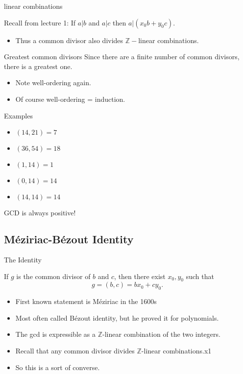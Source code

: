 \documentclass{beamer}
\begin{document}
\begin{frame}{linear combinations}

  Recall from lecture 1: If $a | b$ and $a | c$ then $a|(x_0b +
  y_0c)$.
  \begin{itemize}
  \item Thus a common divisor also divides $\mathbb{Z}-$linear
    combinations.
  \end{itemize}
\end{frame}
  
\begin{frame}{Greatest common divisors}
  Since there are a finite number of common divisors, there is a
  greatest one.
  \begin{itemize}
  \item Note well-ordering again.
  \item Of course well-ordering = induction.
  \end{itemize}
\end{frame}

\begin{frame}{Examples}
  \begin{itemize}
  \item $(14, 21) = 7$
  \item $(36, 54) = 18$
  \item $(1, 14) = 1$
  \item $(0, 14) = 14$
  \item $(14, 14) = 14$
  \end{itemize}
  GCD is always positive!
\end{frame}

\subsection{M\'eziriac-B\'ezout Identity}

\begin{frame}{The Identity}

  If $g$ is the common divisor of $b$ and $c$, then there exist $x_0,
  y_0$ such that $$g = (b, c) = bx_0 + cy_0.$$

  \begin{itemize}
  \item First known statement is M\'eziriac in the 1600s
  \item Most often called B\'ezout identity, but he proved it for
    polynomials.
  \item The gcd is expressible as a $\mathbb{Z}$-linear combination of
    the two integers.
  \item Recall that any common divisor divides $\mathbb{Z}$-linear
    combinations.x1
  \item So this is a sort of converse.
  \end{itemize}

\end{frame}
\end{document}

